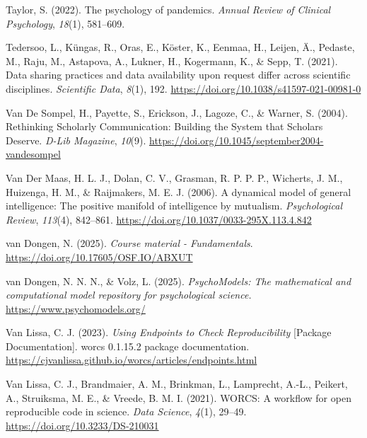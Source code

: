 \documentclass[
  man, noextraspace,floatsintext]{apa7}
\newlength{\cslhangindent}
\newenvironment{CSLReferences}[2] %
 {\begin{list}{}{%
  \setlength{\itemindent}{0pt}
  \setlength{\leftmargin}{0pt}
  \setlength{\parsep}{0pt}
  \ifodd #1
   \setlength{\leftmargin}{\cslhangindent}
   \setlength{\itemindent}{-1\cslhangindent}
  \fi
  \setlength{\itemsep}{#2\baselineskip}}}
 {\end{list}}
\begin{document}
\begin{CSLReferences}{1}{0}
Taylor, S. (2022). The psychology of pandemics. \emph{Annual Review of Clinical Psychology}, \emph{18}(1), 581--609.

Tedersoo, L., Küngas, R., Oras, E., Köster, K., Eenmaa, H., Leijen, Ä., Pedaste, M., Raju, M., Astapova, A., Lukner, H., Kogermann, K., \& Sepp, T. (2021). Data sharing practices and data availability upon request differ across scientific disciplines. \emph{Scientific Data}, \emph{8}(1), 192. \url{https://doi.org/10.1038/s41597-021-00981-0}

Van De Sompel, H., Payette, S., Erickson, J., Lagoze, C., \& Warner, S. (2004). Rethinking {Scholarly Communication}: {Building} the {System} that {Scholars Deserve}. \emph{D-Lib Magazine}, \emph{10}(9). \url{https://doi.org/10.1045/september2004-vandesompel}

Van Der Maas, H. L. J., Dolan, C. V., Grasman, R. P. P. P., Wicherts, J. M., Huizenga, H. M., \& Raijmakers, M. E. J. (2006). A dynamical model of general intelligence: {The} positive manifold of intelligence by mutualism. \emph{Psychological Review}, \emph{113}(4), 842--861. \url{https://doi.org/10.1037/0033-295X.113.4.842}

van Dongen, N. (2025). \emph{Course material - {Fundamentals}}. \url{https://doi.org/10.17605/OSF.IO/ABXUT}

van Dongen, N. N. N., \& Volz, L. (2025). \emph{{PsychoModels}: {The} mathematical and computational model repository for psychological science.} \url{https://www.psychomodels.org/}

Van Lissa, C. J. (2023). \emph{Using {Endpoints} to {Check Reproducibility}} {[}Package Documentation{]}. worcs 0.1.15.2 package documentation. \url{https://cjvanlissa.github.io/worcs/articles/endpoints.html}

Van Lissa, C. J., Brandmaier, A. M., Brinkman, L., Lamprecht, A.-L., Peikert, A., Struiksma, M. E., \& Vreede, B. M. I. (2021). {WORCS}: {A} workflow for open reproducible code in science. \emph{Data Science}, \emph{4}(1), 29--49. \url{https://doi.org/10.3233/DS-210031}


\end{CSLReferences}
\end{document}
